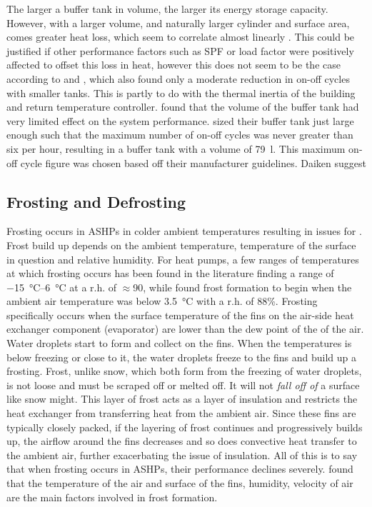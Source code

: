 The larger a buffer tank in volume, the larger its energy storage capacity. However, with a larger volume, and naturally larger cylinder and surface area, comes greater heat loss, which seem to correlate almost linearly \cite{klein_numerical_2014}. This could be justified if other performance factors such as \ac{SPF} or load factor were positively affected to offset this loss in heat, however this does not seem to be the case according to \cite{roccatello_analysis_2022} and \citeauthor{klein_numerical_2014}, which also found only a moderate reduction in on-off cycles with smaller tanks. This is partly to do with the thermal inertia of the building and return temperature controller. 
\citeauthor{klein_numerical_2014} found that the volume of the buffer tank had very limited effect on the system performance. \citeauthor{dongellini_influence_2021} sized their buffer tank just large enough such that the maximum number of on-off cycles was never greater than six per hour,  resulting in a buffer tank with a volume of \SI{79}{\litre}.  This maximum on-off cycle figure was chosen based off their \HP manufacturer guidelines. Daiken suggest %
\cite{dettorre_economic_2018}

\subsection{Frosting and Defrosting}
Frosting occurs in \acp{ASHP} in colder ambient temperatures resulting in issues for \HPs. Frost build up depends on the ambient temperature, temperature of the surface in question and relative humidity. For heat pumps, a few ranges of temperatures at which frosting occurs has been found in the literature \cite{sandstrom_frosting_2021} finding a range of \qtyrange{-15}{6}{\celsius} at a r.h. of $\approx$90, while \cite{kropas_experimental_2021} found frost formation to begin when the ambient air temperature was below \SI{3.5}{\celsius} with a r.h. of 88\%. Frosting specifically occurs when the surface temperature of the fins on the air-side heat exchanger component (evaporator) are lower than the dew point of the of the air. Water droplets start to form and collect on the fins. When the temperatures is below freezing or close to it, the water droplets freeze to the fins and build up a frosting. Frost, unlike snow, which both form from the freezing of water droplets, is not loose and must be scraped off or melted off. It will not \textit{fall off of} a surface like snow might. This layer of frost acts as a layer of insulation and restricts the heat exchanger from transferring heat from the ambient air. Since these fins are typically closely packed, if the layering of frost continues and progressively builds up, the airflow around the fins decreases and so does convective heat transfer to the ambient air, further exacerbating the issue of insulation. All of this is to say that when frosting occurs in \acp{ASHP}, their performance declines severely. \cite{zhang_experimental_2018} found that the temperature of the air and surface of the fins, humidity, velocity of air are the main factors involved in frost formation. 

